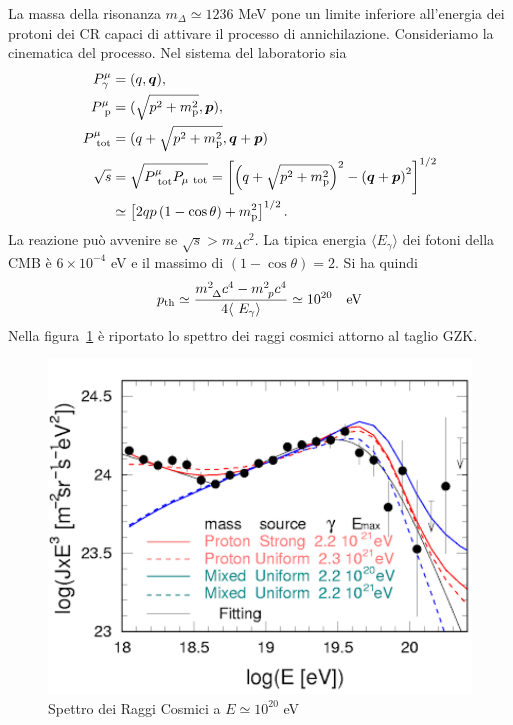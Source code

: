 La massa della risonanza $m_{\Delta} \simeq 1236$ MeV pone un limite inferiore
all'energia dei protoni dei CR capaci di attivare il processo di annichilazione.
Consideriamo la cinematica del processo.  Nel sistema del laboratorio sia
\begin{subequations}
  \begin{align}
    P^{\mu}_{\gamma}       &= (q, \bm{q}), \\
    P^{\mu}_{\ \textup{p}}   &= (\sqrt{p^2+m^2_\textup{p}}, \bm{p}), \\
    P^{\mu}_{\ \textup{tot}} &= ( q+\sqrt{p^2+m^2_\textup{p}}  ,  \bm{q} + \bm{p}) \\
    \sqrt{s} &= \sqrt{ P^{\mu}_{\ \textup{tot}} P_{\mu \ \textup{tot}} } =
                        \left[ \left( q+\sqrt{p^2+m^2_\textup{p}} \right)^2 -
                        \left(\bm{q}+ \bm{p} \right)^2 \right]^{1/2} \\
                      & \simeq \left[ 2qp \left(1-\cos \theta \right) +
                        m_\textup{p}^2 \right]^{1/2}.
  \end{align}
\end{subequations}
La reazione può avvenire se $\sqrt{s} > m_{\Delta} c^2$.  La tipica energia
$\langle E_{\gamma}\rangle$ dei fotoni della CMB è $6 \times 10^{-4}$ eV e il
massimo di $(1-\cos \theta)=2$.  Si ha quindi
\begin{equation}
  p_{\textup{th}} \simeq \frac{m^2_{\ \Delta} c^4 - m^2_{\ p} c^4} {4 \langle
    \ E_{\gamma}\rangle} \simeq 10^{20}~~~{\rm eV}
\end{equation}
Nella figura~\ref{fig:CR2} è riportato lo spettro dei raggi cosmici attorno al
taglio GZK.
\begin{figure}
  \centering{}
  \includegraphics[width=\textwidth]{figure/CR_spectrum_2.pdf}
  \caption{Spettro dei Raggi Cosmici a $E \simeq 10^{20}$ eV}
  \label{fig:CR2}
\end{figure}

